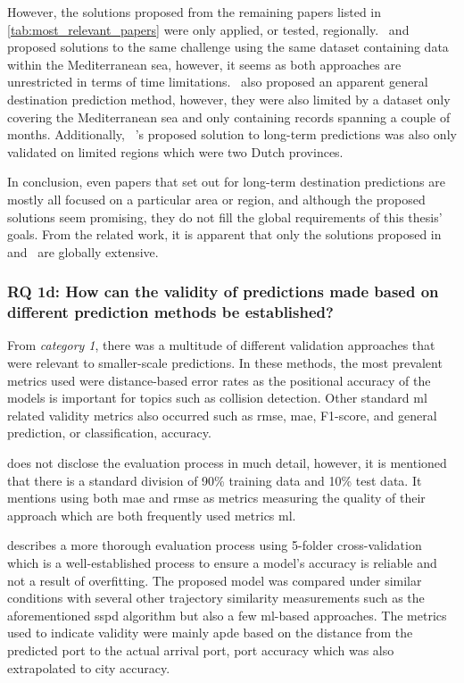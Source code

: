 However, the solutions proposed from the remaining papers listed in \cref{tab:most_relevant_papers} were only applied, or tested, regionally.~\cite{Rosca2018GrandRoutes} and~\cite{Bachar2018GrandDestination} proposed solutions to the same challenge using the same dataset containing data within the Mediterranean sea, however, it seems as both approaches are unrestricted in terms of time limitations.~\cite{Karatas2020TrajectoryData} also proposed an apparent general destination prediction method, however, they were also limited by a dataset only covering the Mediterranean sea and only containing records spanning a couple of months. Additionally, ~\cite{Dobrkovic2018MaritimeData}'s proposed solution to long-term predictions was also only validated on limited regions which were two Dutch provinces.

In conclusion, even papers that set out for long-term destination predictions are mostly all focused on a particular area or region, and although the proposed solutions seem promising, they do not fill the global requirements of this thesis' goals. From the related work, it is apparent that only the solutions proposed in~\cite{lechtenberg2019} and~\cite{Zhang2020AISApproach} are globally extensive.

\subsubsection{RQ 1d: How can the validity of predictions made based on different prediction methods be established?}

From \textit{category 1}, there was a multitude of different validation approaches that were relevant to smaller-scale predictions. In these methods, the most prevalent metrics used were distance-based error rates as the positional accuracy of the models is important for topics such as collision detection. Other standard \acrshort{ml} related validity metrics also occurred such as \acrfull{rmse}, \acrfull{mae}, F1-score, and general prediction, or classification, accuracy.

\cite{lechtenberg2019} does not disclose the evaluation process in much detail, however, it is mentioned that there is a standard division of 90\% training data and 10\% test data. It mentions using both \acrshort{mae} and \acrshort{rmse} as metrics measuring the quality of their approach which are both frequently used metrics \acrshort{ml}.

\cite{Zhang2020AISApproach} describes a more thorough evaluation process using 5-folder cross-validation which is a well-established process to ensure a model's accuracy is reliable and not a result of overfitting. The proposed model was compared under similar conditions with several other trajectory similarity measurements such as the aforementioned \acrshort{sspd} algorithm but also a few \acrshort{ml}-based approaches. The metrics used to indicate validity were mainly \acrfull{apde} based on the distance from the predicted port to the actual arrival port, port accuracy which was also extrapolated to city accuracy.

